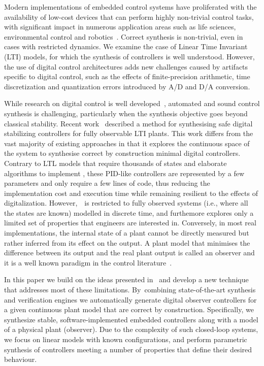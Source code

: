 \documentclass[sigconf]{llncs}
\begin{document}
Modern implementations of embedded control systems have proliferated with
the availability of low-cost devices that can perform highly non-trivial
control tasks, with significant impact in numerous application areas such as
life sciences, environmental control and robotics~\cite{astrom1997computer,Franklin15}.  Correct synthesis is non-trivial, even in cases with
restricted dynamics.  We examine the case of Linear Time Invariant (LTI)
models, for which the synthesis of controllers is well understood.  However,
the use of digital control architectures adds new challenges caused by
artifacts specific to digital control, such as the effects of
finite-precision arithmetic, time discretization and quantization errors
introduced by A/D and D/A conversion.

While research on digital control is well
developed~\cite{astrom1997computer}, automated and sound control synthesis
is challenging, particularly when the synthesis objective goes beyond
classical stability.  Recent work~\cite{abate2017automated} described a
method for synthesising safe digital stabilizing controllers for fully
observable LTI plants.  This work differs from the vast majority of existing
approaches in that it explores the continuous space of the system to
synthesise correct by construction minimal digital controllers.  Contrary to
LTL models that require thousands of states and elaborate algorithms to
implement \cite{reissig2017feedback}, these PID-like controllers are represented by a few parameters
and only require a few lines of code, thus reducing the implementation cost
and execution time while remaining resilient to the effects of digitalization.
However,~\cite{abate2017automated}~is restricted to fully observed
systems (i.e., where all the states are known) modelled in discrete time,
and furthemore explores only a limited set of properties that engineers
are interested in. Conversely, 
in most real implementations, the internal state of a plant cannot be
directly measured but rather inferred from its
effect on the output. A plant model that minimises the difference
between its output and the real plant output is called an observer and it is a well known
paradigm in the control literature~\cite{astrom1997computer}.


In this paper we build on the ideas presented in~\cite{abate2017automated}
and develop a new technique that addresses most of these limitations. 
By~combining state-of-the-art synthesis and verification engines we
automatically generate digital observer controllers for a given continuous
plant model that are correct by construction.  %
Specifically, we synthesize stable,
software-implemented embedded controllers along with a model of a physical
plant (observer).  Due to the complexity of such closed-loop systems, we focus
on linear models with known configurations, and perform
parametric synthesis of controllers meeting a number of properties that
define their desired behaviour.
\end{document}
